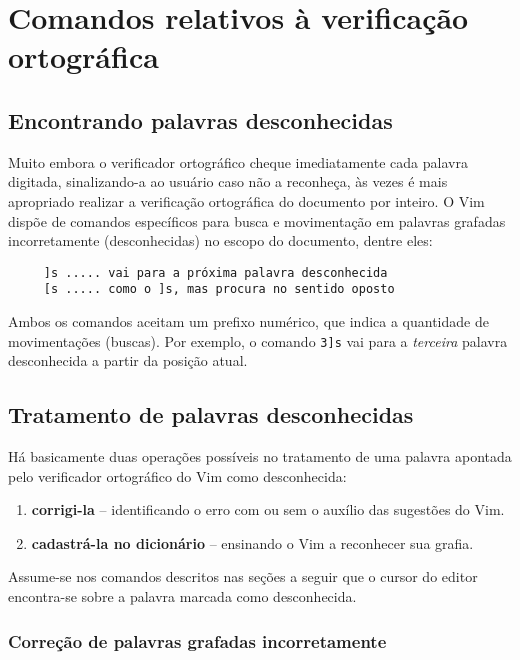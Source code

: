 \section{Comandos relativos à verificação ortográfica}

\subsection{Encontrando palavras desconhecidas}

Muito embora o verificador ortográfico cheque imediatamente cada palavra
digitada, sinalizando-a ao usuário caso não a reconheça, às vezes é mais
apropriado realizar a verificação ortográfica do documento por inteiro.
O Vim dispõe de comandos específicos para busca e movimentação em palavras
grafadas incorretamente (desconhecidas) no escopo do documento, dentre eles:

\begin{verbatim}
     ]s ..... vai para a próxima palavra desconhecida
     [s ..... como o ]s, mas procura no sentido oposto
\end{verbatim}

Ambos os comandos aceitam um prefixo numérico, que indica a quantidade de
movimentações (buscas). Por exemplo, o comando {\tt 3]s} vai para a {\em
terceira} palavra desconhecida a partir da posição atual.

\subsection{Tratamento de palavras desconhecidas}

Há basicamente duas operações possíveis no tratamento de uma palavra apontada
pelo verificador ortográfico do Vim como desconhecida: 

\begin{enumerate}
\item {\bf corrigi-la} -- identificando o erro com ou sem o auxílio das
sugestões do Vim.
\item {\bf cadastrá-la no dicionário} -- ensinando o Vim a reconhecer sua
grafia.
\end{enumerate}

Assume-se nos comandos descritos nas seções a seguir que o cursor do editor
encontra-se sobre a palavra marcada como desconhecida.

\subsubsection{Correção de palavras grafadas incorretamente}

